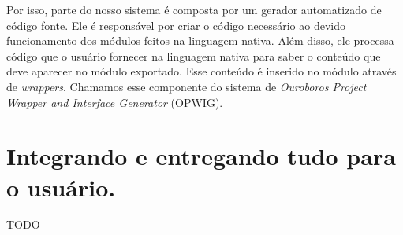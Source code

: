   Por isso, parte do nosso sistema é composta por um gerador automatizado de código fonte.
  Ele é responsável por criar o código necessário ao devido funcionamento dos módulos 
  feitos na linguagem nativa. Além disso, ele processa código que o usuário fornecer na
  linguagem nativa para saber o conteúdo que deve aparecer no módulo exportado.
  Esse conteúdo é inserido no módulo através de \emph{wrappers}. Chamamos esse componente
  do sistema de \emph{Ouroboros Project Wrapper and Interface Generator} (OPWIG).
  
  
  \section{Integrando e entregando tudo para o usuário.}
  \label{sec:estrutura:integration}
  TODO
